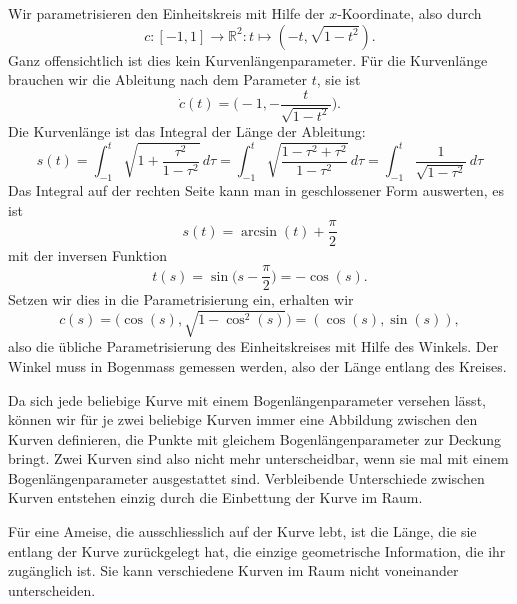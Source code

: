 \begin{beispiel}
Wir parametrisieren den Einheitskreis mit Hilfe der $x$-Koordinate, also
durch
\[
c\colon
[-1,1]\to\mathbb R^2
\colon
t\mapsto (-t,\sqrt{1-t^2}).
\]
Ganz offensichtlich ist dies kein Kurvenlängenparameter.
Für die Kurvenlänge brauchen wir die Ableitung nach dem Parameter $t$,
sie ist
\[
\dot c(t)=\biggl(-1, -\frac{t}{\sqrt{1-t^2}}\biggr).
\]
Die Kurvenlänge ist das Integral der Länge der Ableitung:
\[
s(t)
=
\int_{-1}^t \sqrt{1 + \frac{\tau^2}{1-\tau^2}}\,d\tau
=
\int_{-1}^t \sqrt{\frac{1-\tau^2 +\tau^2}{1-\tau^2}}\,d\tau
=
\int_{-1}^t \frac{1}{\sqrt{1-\tau^2}}\,d\tau
\]
Das Integral auf der rechten Seite kann man in geschlossener
Form auswerten, es ist
\[
s(t)=\arcsin(t) + \frac{\pi}{2}
\]
mit der inversen Funktion
\[
t(s)
=
\sin\biggl(s-\frac{\pi}2\biggr)
=
-\cos(s).
\]
Setzen wir dies in die Parametrisierung ein, erhalten wir
\[
c(s)
=
\bigl(\cos(s), \sqrt{1-\cos^2(s)}\bigr)
=
(\cos(s), \sin(s)),
\]
also die übliche Parametrisierung des Einheitskreises mit Hilfe
des Winkels.
Der Winkel muss in Bogenmass gemessen werden, also der Länge entlang
des Kreises.
\end{beispiel}

Da sich jede beliebige Kurve mit einem Bogenlängenparameter versehen
lässt, können wir für je zwei beliebige Kurven immer eine Abbildung
zwischen den Kurven definieren, die Punkte mit gleichem Bogenlängenparameter
zur Deckung bringt.
Zwei Kurven sind also nicht mehr unterscheidbar, wenn sie mal mit
einem Bogenlängenparameter ausgestattet sind.
Verbleibende Unterschiede zwischen Kurven entstehen einzig durch die
Einbettung der Kurve im Raum.

Für eine Ameise, die ausschliesslich auf der Kurve lebt, ist die Länge,
die sie entlang der Kurve zurückgelegt hat, die einzige geometrische
Information, die ihr zugänglich ist.
Sie kann verschiedene Kurven im Raum nicht voneinander unterscheiden.

